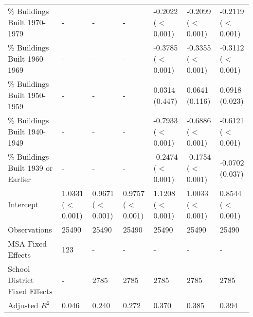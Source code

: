 \begin{landscape}
\begin{table}[h]
\begin{tabular}{l|llllll}
\% Buildings Built 1970-1979 &- & - & - & -0.2022 ($<$0.001) & -0.2099 ($<$0.001) & -0.2119 ($<$0.001) \\
\% Buildings Built 1960-1969 &- & - & - & -0.3785 ($<$0.001) & -0.3355 ($<$0.001) & -0.3112 ($<$0.001) \\
\% Buildings Built 1950-1959 &- & - & - & 0.0314 (0.447) & 0.0641 (0.116) & 0.0918 (0.023) \\
\% Buildings Built 1940-1949 &- & - & - & -0.7933 ($<$0.001) & -0.6886 ($<$0.001) & -0.6121 ($<$0.001) \\
\% Buildings Built 1939 or Earlier &- & - & - & -0.2474 ($<$0.001) & -0.1754 ($<$0.001) & -0.0702 (0.037) \\
Intercept &1.0331 ($<$0.001) & 0.9671 ($<$0.001) & 0.9757 ($<$0.001) & 1.1208 ($<$0.001) & 1.0033 ($<$0.001) & 0.8544 ($<$0.001) \\
Observations &25490 & 25490 & 25490 & 25490 & 25490 & 25490 \\
MSA Fixed Effects &123 & - & - & - & - & - \\
School District Fixed Effects &- & 2785 & 2785 & 2785 & 2785 & 2785 \\
Adjusted $R^2$ &0.046 & 0.240 & 0.272 & 0.370 & 0.385 & 0.394 \\\hline
\end{tabular}
\end{table}
\newpage
\end{landscape}
\restoregeometry
